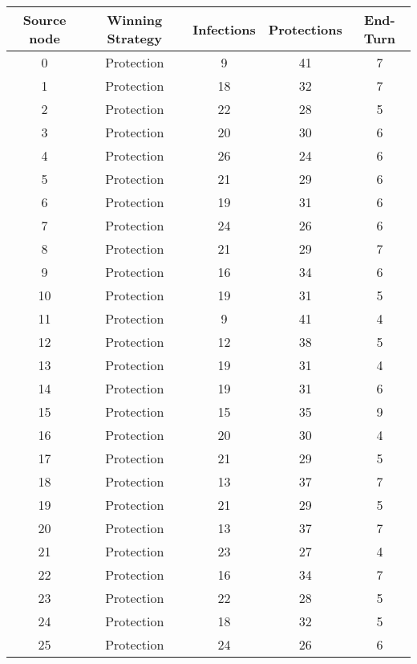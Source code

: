 \documentclass[results.tex]{subfiles}
\begin{document}
\begin{center}
  \begin{tabular}{| c || c | c | c | c |}
    \hline
    {\bfseries Source node} & {\bfseries Winning Strategy} & {\bfseries Infections} & {\bfseries Protections} & {\bfseries End-Turn} \\  %
    \hline\hline
    0 & Protection & 9 & 41 & 7 \\ 
    \hline
    1 & Protection & 18 & 32 & 7 \\ 
    \hline
    2 & Protection & 22 & 28 & 5 \\ 
    \hline
    3 & Protection & 20 & 30 & 6 \\ 
    \hline
    4 & Protection & 26 & 24 & 6 \\ 
    \hline
    5 & Protection & 21 & 29 & 6 \\ 
    \hline
    6 & Protection & 19 & 31 & 6 \\ 
    \hline
    7 & Protection & 24 & 26 & 6 \\ 
    \hline
    8 & Protection & 21 & 29 & 7 \\ 
    \hline
    9 & Protection & 16 & 34 & 6 \\ 
    \hline
    10 & Protection & 19 & 31 & 5 \\ 
    \hline
    11 & Protection & 9 & 41 & 4 \\ 
    \hline
    12 & Protection & 12 & 38 & 5 \\ 
    \hline
    13 & Protection & 19 & 31 & 4 \\ 
    \hline
    14 & Protection & 19 & 31 & 6 \\ 
    \hline
    15 & Protection & 15 & 35 & 9 \\ 
    \hline
    16 & Protection & 20 & 30 & 4 \\ 
    \hline
    17 & Protection & 21 & 29 & 5 \\ 
    \hline
    18 & Protection & 13 & 37 & 7 \\ 
    \hline
    19 & Protection & 21 & 29 & 5 \\ 
    \hline
    20 & Protection & 13 & 37 & 7 \\ 
    \hline
    21 & Protection & 23 & 27 & 4 \\ 
    \hline
    22 & Protection & 16 & 34 & 7 \\ 
    \hline
    23 & Protection & 22 & 28 & 5 \\ 
    \hline
    24 & Protection & 18 & 32 & 5 \\ 
    \hline
    25 & Protection & 24 & 26 & 6 \\ 

\end{tabular}
\end{center}
\end{document}
